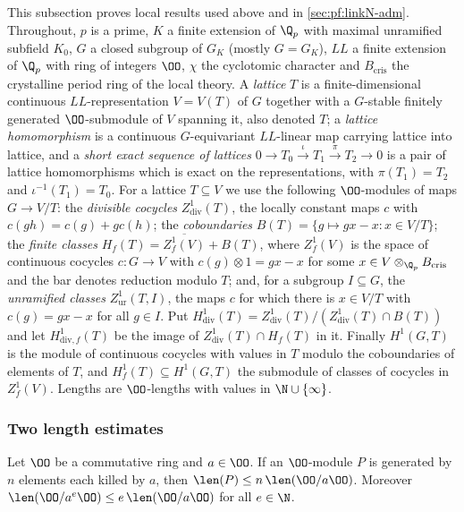 This subsection proves local results used above and in \cref{sec:pf:linkN-adm}. Throughout, $p$ is a prime, $K$ a finite extension
of $\Q_p$ with maximal unramified subfield $K_0$, $G$ a closed subgroup of $G_K$ (mostly $G=G_K$), $\mathit{LL}$ a finite extension of
$\Q_p$ with ring of integers $\OO$, $\chi$ the cyclotomic character and $B_{\mathrm{cris}}$ the crystalline period ring of the local
theory. A \emph{lattice} $T$ is a finite-dimensional continuous $\mathit{LL}$-representation $V=V(T)$ of $G$ together with a
$G$-stable finitely generated $\OO$-submodule of $V$ spanning it, also denoted $T$; a \emph{lattice homomorphism} is a continuous
$G$-equivariant $\mathit{LL}$-linear map carrying lattice into lattice, and a \emph{short exact sequence of lattices}
$0\to T_0\xrightarrow{\iota}T_1\xrightarrow{\pi}T_2\to0$ is a pair of lattice homomorphisms which is exact on the representations,
with $\pi(T_1)=T_2$ and $\iota^{-1}(T_1)=T_0$. For a lattice $T\subseteq V$ we use the following $\OO$-modules of maps $G\to V/T$:
the \emph{divisible cocycles} $Z^1_{\mathrm{div}}(T)$, the locally constant maps $c$ with $c(gh)=c(g)+gc(h)$; the
\emph{coboundaries} $B(T)=\{g\mapsto gx-x:x\in V/T\}$; the \emph{finite classes} $H_f(T)=\overline{Z^1_f(V)}+B(T)$, where $Z^1_f(V)$
is the space of continuous cocycles $c\colon G\to V$ with $c(g)\otimes1=gx-x$ for some $x\in V\otimes_{\Q_p}B_{\mathrm{cris}}$ and the
bar denotes reduction modulo $T$; and, for a subgroup $I\subseteq G$, the \emph{unramified classes} $Z^1_{\mathrm{ur}}(T,I)$, the maps
$c$ for which there is $x\in V/T$ with $c(g)=gx-x$ for all $g\in I$. Put
$H^1_{\mathrm{div}}(T)=Z^1_{\mathrm{div}}(T)/(Z^1_{\mathrm{div}}(T)\cap B(T))$ and let $H^1_{\mathrm{div},f}(T)$ be the image of
$Z^1_{\mathrm{div}}(T)\cap H_f(T)$ in it. Finally $H^1(G,T)$ is the module of continuous cocycles with values in $T$ modulo the
coboundaries of elements of $T$, and $H^1_f(T)\subseteq H^1(G,T)$ the submodule of classes of cocycles in $Z^1_f(V)$. Lengths are
$\OO$-lengths with values in $\N\cup\{\infty\}$.

\subsubsection{Two length estimates}

\begin{lemma}\label{pf:linkN-sel:torslen}
Let $\OO$ be a commutative ring and $a\in\OO$. If an $\OO$-module $P$ is generated by $n$ elements each killed by $a$, then
$\len(P)\le n\,\len(\OO/a\OO)$. Moreover $\len(\OO/a^e\OO)\le e\,\len(\OO/a\OO)$ for all $e\in\N$.
\end{lemma}

